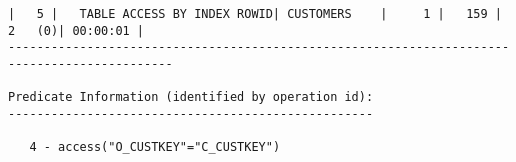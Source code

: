 \documentclass[11pt,a4paper,parskip=half]{scrartcl}
\begin{document}
\begin{lstlisting}
|   5 |   TABLE ACCESS BY INDEX ROWID| CUSTOMERS    |     1 |   159 |     2   (0)| 00:00:01 |                                                                                                                                                                                                                
---------------------------------------------------------------------------------------------                                                                                                                                                                                                                
                                                                                                                                                                                                                                                                                                             
Predicate Information (identified by operation id):                                                                                                                                                                                                                                                          
---------------------------------------------------                                                                                                                                                                                                                                                          
                                                                                                                                                                                                                                                                                                             
   4 - access("O_CUSTKEY"="C_CUSTKEY")                                                                                                                                                                                                                                                                       
\end{lstlisting}
\end{document}
